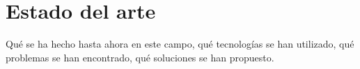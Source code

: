 \section{Estado del arte}
Qué se ha hecho hasta ahora en este campo, qué tecnologías se han utilizado, qué problemas se han encontrado, qué soluciones se han propuesto.

%
%
